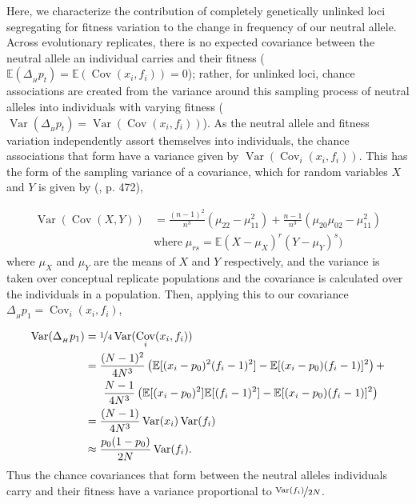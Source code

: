\documentclass[11pt]{article}
\newcommand{\E}{\mathbb{E}}
\DeclareMathOperator{\var}{Var}
\DeclareMathOperator{\cov}{Cov}
\begin{document}
Here, we characterize the contribution of completely genetically unlinked loci
segregating for fitness variation to the change in frequency of our neutral
allele. Across evolutionary replicates, there is no expected covariance between
the neutral allele an individual carries and their fitness ($\E(\Delta_{_H}
p_t)= \E(\cov(x_i, f_i)) = 0$); rather, for unlinked loci, chance associations
are created from the variance around this sampling process of neutral alleles
into individuals with varying fitness ($\var(\Delta_{_H} p_t)= \var(\cov(x_i,
f_i))$). As the neutral allele and fitness variation independently assort
themselves into individuals, the chance associations that form have a variance
given by $\var(\cov_i(x_i, f_i))$.  This has the form of the sampling variance
of a covariance, which for random variables $X$ and $Y$ is given by
\citeauthor{Kendall1994-gp} (\citeyear{Kendall1994-gp}, p. 472),

\begin{align}
  \var(\cov(X, Y)) &= \frac{(n-1)^2}{n^3} (\mu_{22} - \mu_{11}^2) + \frac{n-1}{n^3} (\mu_{20}\mu_{02} - \mu_{11}^2)  \\
                   &\text{where} \; \mu_{rs} = \E(X-\mu_X)^r(Y-\mu_Y)^s)
\end{align}
%
where $\mu_X$ and $\mu_Y$ are the means of $X$ and $Y$ respectively, and
the variance is taken over conceptual replicate populations and the covariance
is calculated over the individuals in a population.  Then, applying this to
our covariance $\Delta_{_H} p_1 = \cov_i(x_i, f_i)$,

\begin{align}
  \label{eq:strength-assoc}
  \var(\Delta_{_H} p_1) &= \nicefrac{1}{4}\var(\cov_i(x_i, f_i)) \nonumber \\
                     &= \frac{(N-1)^2}{4N^3} \left(\E[(x_i - p_0)^2 (f_i - 1)^2] - \E[(x_i - p_0) (f_i - 1)]^2 \right)+ \nonumber \\
                     &\;\;\;\;\;\; \frac{N-1}{4N^3} \left(\E[(x_i - p_0)^2] \E[(f_i - 1)^2] - \E[(x_i -p_0)(f_i-1)]^2\right) \nonumber \\
                     &= \frac{(N-1)}{4N^3} \var(x_i) \var(f_i) \nonumber \\
                     &\approx \frac{p_0(1-p_0) }{2N} \var(f_i).
\end{align}
%
Thus the chance covariances that form between the neutral alleles individuals
carry and their fitness have a variance proportional to
$\nicefrac{\var(f_i)}{2N}$. 
\end{document}

